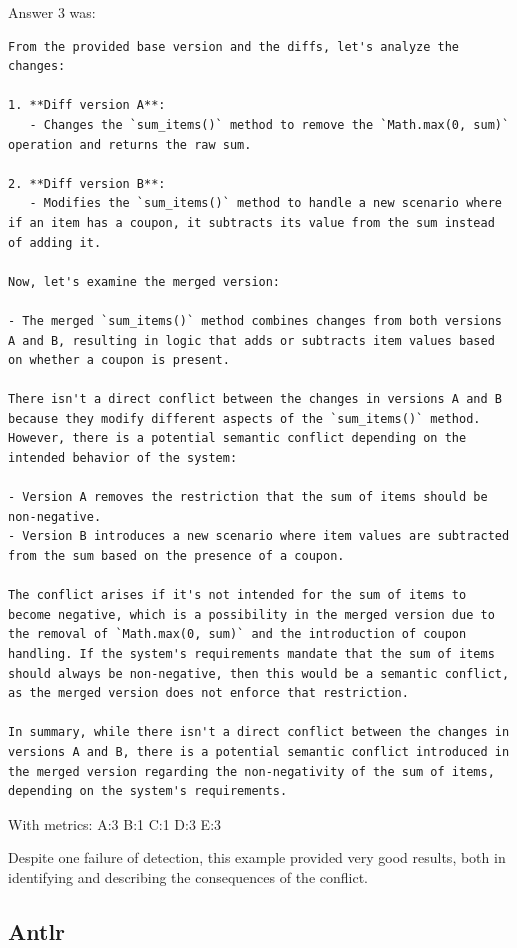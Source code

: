 Answer 3 was:
\begin{lstlisting}
From the provided base version and the diffs, let's analyze the changes:

1. **Diff version A**:
   - Changes the `sum_items()` method to remove the `Math.max(0, sum)` operation and returns the raw sum.
   
2. **Diff version B**:
   - Modifies the `sum_items()` method to handle a new scenario where if an item has a coupon, it subtracts its value from the sum instead of adding it.
   
Now, let's examine the merged version:

- The merged `sum_items()` method combines changes from both versions A and B, resulting in logic that adds or subtracts item values based on whether a coupon is present.
  
There isn't a direct conflict between the changes in versions A and B because they modify different aspects of the `sum_items()` method. However, there is a potential semantic conflict depending on the intended behavior of the system:

- Version A removes the restriction that the sum of items should be non-negative.
- Version B introduces a new scenario where item values are subtracted from the sum based on the presence of a coupon.

The conflict arises if it's not intended for the sum of items to become negative, which is a possibility in the merged version due to the removal of `Math.max(0, sum)` and the introduction of coupon handling. If the system's requirements mandate that the sum of items should always be non-negative, then this would be a semantic conflict, as the merged version does not enforce that restriction.

In summary, while there isn't a direct conflict between the changes in versions A and B, there is a potential semantic conflict introduced in the merged version regarding the non-negativity of the sum of items, depending on the system's requirements.
\end{lstlisting}

With metrics:
A:3
B:1
C:1
D:3
E:3

Despite one failure of detection, this example provided very good results, both in identifying and describing the consequences of the conflict.

\subsection{Antlr}

